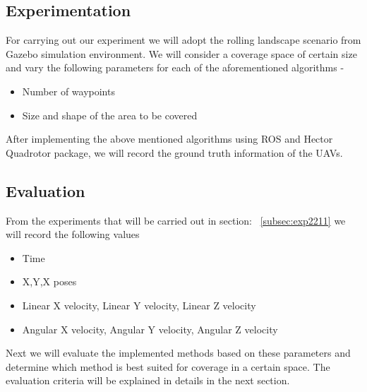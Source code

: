 \subsection{Experimentation}

For carrying out our experiment we will adopt the rolling landscape scenario from Gazebo simulation environment. We will consider a coverage space of certain size and vary the following parameters for each of the aforementioned algorithms - 
\begin{itemize}
\item Number of waypoints 
\item Size and shape of the area to be covered
\end{itemize}
After implementing the above mentioned algorithms using ROS and Hector Quadrotor package, we will record the ground truth information of the UAVs. 

\subsection{Evaluation}

From the experiments that will be carried out in section: ~\ref{subsec:exp2211} we will record the following values
\begin{itemize}
\item Time
\item X,Y,X poses
\item Linear X velocity, Linear Y velocity, Linear Z velocity
\item Angular X velocity, Angular Y velocity, Angular Z velocity
\end{itemize}

Next we will evaluate the implemented methods based on these parameters and determine which method is best suited for coverage in a certain space. The evaluation criteria will be explained in details in the next section. 